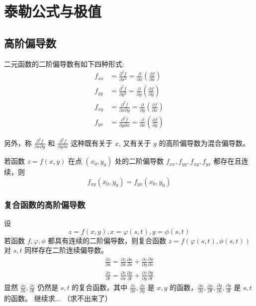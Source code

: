 \section{泰勒公式与极值}

\subsection{高阶偏导数}

二元函数的二阶偏导数有如下四种形式:
\[
    \begin{aligned}
        f_{xx} & =\frac{\partial^2 f}{\partial x^2}=\frac{\partial}{\partial x}\left(\frac{\partial f}{\partial x}\right)         \\
        f_{yy} & =\frac{\partial^2 f}{\partial y^2}=\frac{\partial}{\partial y}\left(\frac{\partial f}{\partial y}\right)         \\
        f_{xy} & =\frac{\partial^2 f}{\partial x\partial y}=\frac{\partial}{\partial y}\left(\frac{\partial f}{\partial x}\right) \\
        f_{yx} & =\frac{\partial^2 f}{\partial y\partial x}=\frac{\partial}{\partial x}\left(\frac{\partial f}{\partial y}\right)
    \end{aligned}
\]

另外，称 $\frac{\partial^2 f}{\partial x\partial y}$ 和 $\frac{\partial^2 f}{\partial y\partial x}$ 这种既有关于 $x$, 又有关于 $y$ 的高阶偏导数为混合偏导数。
\begin{theorem}
    若函数 $z=f(x,y)$ 在点 $(x_0,y_0)$ 处的二阶偏导数 $f_{xx},f_{yy},f_{xy},f_{yx}$ 都存在且连续，则
    \[
        f_{xy}(x_0,y_0)=f_{yx}(x_0,y_0)
    \]
\end{theorem}

\subsubsection{复合函数的高阶偏导数}

设
\[
    z=f(x,y), x=\varphi(s,t), y=\phi(s,t)
\]
若函数 $f,\varphi,\phi$ 都具有连续的二阶偏导数，则复合函数 $z=f(\varphi(s,t),\phi(s,t))$ 对 $s,t$ 同样存在二阶连续偏导数。
\[
    \begin{aligned}
        \frac{\partial z}{\partial s}=\frac{\partial z}{\partial x}\frac{\partial x}{\partial s}+\frac{\partial z}{\partial y}\frac{\partial y}{\partial s} \\
        \frac{\partial z}{\partial t}= \frac{\partial z}{\partial x}\frac{\partial x}{\partial t}+\frac{\partial z}{\partial y}\frac{\partial y}{\partial t}
    \end{aligned}
\]
显然 $\frac{\partial z}{\partial s},\frac{\partial z}{\partial t}$ 仍然是 $s,t$ 的复合函数，其中 $\frac{\partial z}{\partial x},\frac{\partial z}{\partial y}$ 是 $x,y$ 的函数，$\frac{\partial x}{\partial s},\frac{\partial x}{\partial t}, \frac{\partial y}{\partial s}, \frac{\partial y}{\partial t}$ 是 $s,t$ 的函数。
继续求... （求不出来了）

